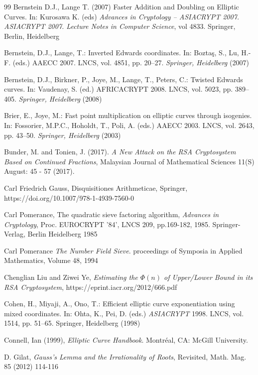 \documentclass[sigconf,balance=false]{acmart}
\begin{document}
\begin{thebibliography}{99}
 Bernstein D.J., Lange T. (2007) Faster Addition and Doubling on Elliptic Curves. In: Kurosawa K. (eds) \emph{Advances in Cryptology – ASIACRYPT 2007. ASIACRYPT 2007. Lecture Notes in Computer Science}, vol 4833. Springer, Berlin, Heidelberg

 Bernstein, D.J., Lange, T.: Inverted Edwards coordinates. In: Boztaş, S., Lu, H.-F. (eds.) AAECC 2007. LNCS, vol. 4851, pp. 20–27. \emph{Springer, Heidelberg} (2007)

 Bernstein, D.J., Birkner, P., Joye, M., Lange, T., Peters, C.: Twisted Edwards curves. In: Vaudenay, S. (ed.) AFRICACRYPT 2008. LNCS, vol. 5023, pp. 389–405. \emph{Springer, Heidelberg} (2008)

 Brier, E., Joye, M.: Fast point multiplication on elliptic curves through isogenies. In: Fossorier, M.P.C., Hoholdt, T., Poli, A. (eds.) AAECC 2003. LNCS, vol. 2643, pp. 43–50. \emph{Springer, Heidelberg} (2003)

 Bunder, M. and Tonien, J. (2017). \emph{A New Attack on the RSA Cryptosystem Based on Continued Fractions}, Malaysian Journal of Mathematical Sciences 11(S) August: 45 - 57 (2017).

 Carl Friedrich Gauss, Disquisitiones Arithmeticae, Springer, https://doi.org/10.1007/978-1-4939-7560-0

 Carl Pomerance, The quadratic sieve factoring algorithm, \emph{Advances in Cryptology}, Proc. EUROCRYPT '84', LNCS 209, pp.169-182, 1985. Springer-Verlag, Berlin Heidelberg 1985

 Carl Pomerance \emph{The Number Field Sieve}. proceedings of Symposia in Applied Mathematics, Volume 48, 1994


 Chenglian Liu and Ziwei Ye, \emph{Estimating the $\Phi(n)$ of Upper/Lower Bound in its RSA Cryptosystem}, https://eprint.iacr.org/2012/666.pdf

 Cohen, H., Miyaji, A., Ono, T.: Efficient elliptic curve exponentiation using mixed coordinates. In: Ohta, K., Pei, D. (eds.) \emph{ASIACRYPT} 1998. LNCS, vol. 1514, pp. 51–65. Springer, Heidelberg (1998)

 Connell, Ian (1999), \emph{Elliptic Curve Handbook}. Montréal, CA: McGill University.

 D. Gilat, \emph{Gauss's Lemma and the Irrationality of Roots}, Revisited, Math. Mag. 85 (2012) 114-116


\end{thebibliography}
\end{document}
